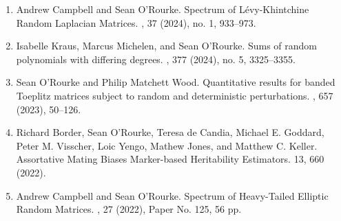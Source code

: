 \documentclass[letterpaper]{article}
\begin{document}
\begin{enumerate}
	\item Andrew Campbell and Sean O'Rourke. 
	\newblock Spectrum of L\'{e}vy-Khintchine Random Laplacian Matrices. 
	,  37 (2024), no. 1, 933--973.  

	\item Isabelle Kraus, Marcus Michelen, and Sean O'Rourke.
	\newblock Sums of random polynomials with differing degrees. 
	,  377 (2024), no. 5, 3325--3355.  
	
	\item Sean O'Rourke and Philip Matchett Wood.
	\newblock Quantitative results for banded Toeplitz matrices subject to random and deterministic perturbations. 
	,  657 (2023), 50--126. 
	
	\item Richard Border, Sean O'Rourke, Teresa de Candia, Michael E. Goddard, Peter M. Visscher, Loic Yengo, Mathew Jones, and Matthew C. Keller. 
	\newblock Assortative Mating Biases Marker-based Heritability Estimators.
	 13, 660 (2022). 
	
	\item Andrew Campbell and Sean O'Rourke.
	\newblock Spectrum of Heavy-Tailed Elliptic Random Matrices.  
	, 27 (2022), Paper No. 125, 56 pp. 
	

\end{enumerate}
\end{document}
